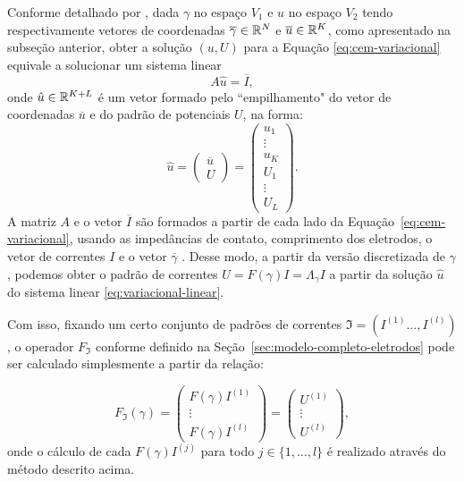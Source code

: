 Conforme detalhado por , dada $\gamma$ no espaço $V_1$ e $u$ no espaço $V_2$ tendo respectivamente vetores de coordenadas $\overline \gamma\in \mathbb{R}^N$ e $\overline u \in \mathbb{R}^K$, como apresentado na subseção anterior, obter a solução $(u,U)$ para a Equação \eqref{eq:cem-variacional} equivale a solucionar um sistema linear
\begin{equation}\label{eq:variacional-linear}
    A \hat u = \overline{I},
\end{equation}
onde $\hat u \in \mathbb{R}^{K+L}$ é um vetor formado pelo ``empilhamento" do vetor de coordenadas $\overline u$ e do padrão de potenciais $U$, na forma:
\begin{equation}
    \hat u = \begin{pmatrix}
        \overline u \\
        U
    \end{pmatrix} = \begin{pmatrix}
        u_1 \\
        \vdots \\
        u_K \\
        U_1 \\
        \vdots \\
        U_L
    \end{pmatrix}.
\end{equation}
A matriz $A$ e o vetor $\overline I$ são formados a partir de cada lado da Equação~\eqref{eq:cem-variacional}, usando as impedâncias de contato, comprimento dos eletrodos, o vetor de correntes $I$ e o vetor $\overline \gamma$ \cite{santana}. Desse modo, a partir da versão discretizada de $\gamma$, podemos obter o padrão de correntes $U = F(\gamma)I = \Lambda_\gamma I$ a partir da solução $\hat u$ do sistema linear \eqref{eq:variacional-linear}.

Com isso, fixando um certo conjunto de padrões de correntes $\mathfrak I = (I^{(1)}\dots, I^{(l)})$, o operador $F_{\mathfrak I}$ conforme definido na Seção~\ref{sec:modelo-completo-eletrodos} pode ser calculado simplesmente a partir da relação:

\begin{equation}
    F_{\mathfrak I}(\gamma) = \begin{pmatrix}
        F(\gamma) I^{(1)} \\
        \vdots \\
        F(\gamma) I^{(l)}
    \end{pmatrix} = \begin{pmatrix}
        U^{(1)} \\
        \vdots \\
        U^{(l)}
    \end{pmatrix},
\end{equation}
onde o cálculo de cada $F(\gamma)I^{(j)}$ para todo $j \in \{1, \dots, l\}$ é realizado através do método descrito acima.


